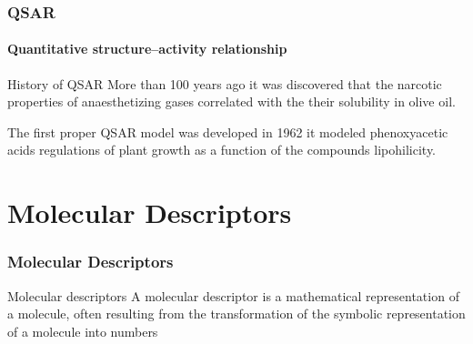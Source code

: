 \documentclass[aspectratio=169]{beamer}
\begin{document}
    \begin{frame}
        \frametitle{QSAR}
        \framesubtitle{Quantitative structure–activity relationship}
        \begin{block}{History of QSAR}
            More than 100 years ago it was discovered that the narcotic
            properties of anaesthetizing gases correlated with the their
            solubility in olive oil. 
            \vspace{0.5\baselineskip}

            \alert{The first proper QSAR model was developed in 1962} it
            modeled phenoxyacetic acids regulations of plant growth as a
            function of the compounds lipohilicity. 
        \end{block}
    \end{frame}

\section{Molecular Descriptors}
    \begin{frame}
        \frametitle{Molecular Descriptors}
                \begin{block}{Molecular descriptors} 
A molecular \alert{descriptor} is a \alert{mathematical representation} of a
molecule, often resulting from the \alert{transformation} of the \alert{symbolic
representation} of a molecule into \alert{numbers}
        \end{block}

    \end{frame}
\end{document}
